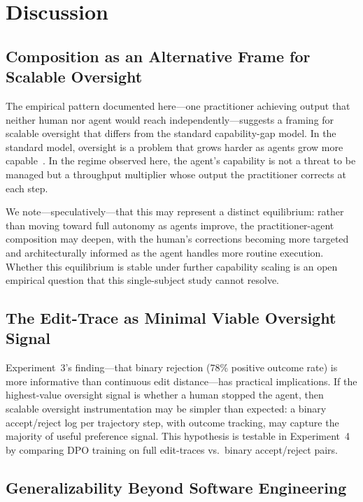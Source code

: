 \documentclass[11pt]{article}
\begin{document}
\section{Discussion}
\label{sec:discussion}

\subsection{Composition as an Alternative Frame for Scalable Oversight}

The empirical pattern documented here---one practitioner achieving output that neither human nor agent would reach independently---suggests a framing for scalable oversight that differs from the standard capability-gap model.
In the standard model, oversight is a problem that grows harder as agents grow more capable~\citep{bowman2022measuring, burns2023weak}.
In the regime observed here, the agent's capability is not a threat to be managed but a throughput multiplier whose output the practitioner corrects at each step.

We note---speculatively---that this may represent a distinct equilibrium: rather than moving toward full autonomy as agents improve, the practitioner-agent composition may deepen, with the human's corrections becoming more targeted and architecturally informed as the agent handles more routine execution.
Whether this equilibrium is stable under further capability scaling is an open empirical question that this single-subject study cannot resolve.

\subsection{The Edit-Trace as Minimal Viable Oversight Signal}

Experiment~3's finding---that binary rejection (78\% positive outcome rate) is more informative than continuous edit distance---has practical implications.
If the highest-value oversight signal is whether a human stopped the agent, then scalable oversight instrumentation may be simpler than expected: a binary accept/reject log per trajectory step, with outcome tracking, may capture the majority of useful preference signal.
This hypothesis is testable in Experiment~4 by comparing DPO training on full edit-traces vs.\ binary accept/reject pairs.

\subsection{Generalizability Beyond Software Engineering}
\end{document}
